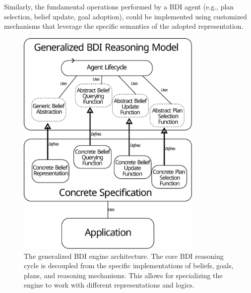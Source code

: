 Similarly, the fundamental operations performed by a \ac{BDI} agent (e.g., plan selection, belief update, goal adoption), could be implemented using customized mechanisms that leverage the specific semantics of the adopted representation.

\begin{figure}
    \centering
    \includegraphics[width=0.8\textwidth]{figures/generalize_bdi.pdf}
    \caption{
        The generalized \ac{BDI} engine architecture.
        The core \ac{BDI} reasoning cycle is decoupled from the specific implementations of beliefs, goals, plans, and reasoning mechanisms.
        This allows for specializing the engine to work with different representations and logics.
    }
    \label{fig:generalized-bdi-engine}
\end{figure}



